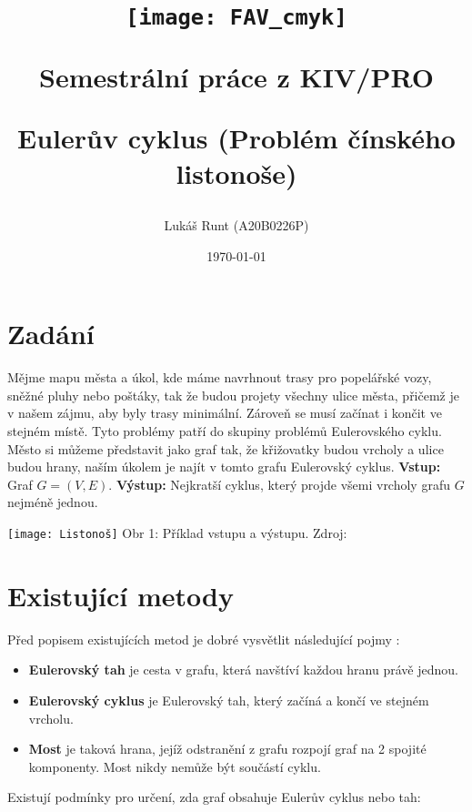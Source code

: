 \documentclass[12pt, a4paper]{article}
\title{\texttt{[image: FAV\_cmyk]}

{\huge Semestrální práce z KIV/PRO}

\vspace{0.5cm}
{\LARGE Eulerův cyklus (Problém čínského listonoše)}
\vspace{1cm}
}
\author{Lukáš Runt (A20B0226P)}
\date{\vspace{7.5cm} \today}
\begin{document}
\begin{titlepage}
\clearpage\maketitle
\thispagestyle{empty}
\end{titlepage}

\tableofcontents
\newpage
\section{Zadání}
Mějme mapu města a úkol, kde máme navrhnout trasy pro popelářské vozy, sněžné pluhy nebo poštáky, tak že budou projety všechny ulice města, přičemž je v našem zájmu, aby byly trasy minimální. Zároveň se musí začínat i končit ve stejném místě. Tyto problémy patří do skupiny problémů Eulerovského cyklu. Město si můžeme představit jako graf tak, že křižovatky budou vrcholy a ulice budou hrany, naším úkolem je najít v tomto grafu Eulerovský cyklus.
\vspace{0.5cm}
\newline\textbf{Vstup:} Graf $G = (V, E)$.
\vspace{0.5cm}
\newline\textbf{Výstup:} Nejkratší cyklus, který projde všemi vrcholy grafu $G$ nejméně jednou.
\begin{center}
	\texttt{[image: Listonoš]}
	\newline Obr 1: Příklad vstupu a výstupu. Zdroj: \cite{skiena1998algorithm}
\end{center}
\section{Existující metody}
Před popisem existujících metod je dobré vysvětlit následující pojmy \cite{Fleury}:
\begin{itemize}
\item \textbf{Eulerovský tah} je cesta v grafu, která navštíví každou hranu právě jednou.
\item \textbf{Eulerovský cyklus} je Eulerovský tah, který začíná a končí ve stejném vrcholu.
\item \textbf{Most} je taková hrana, jejíž odstranění z grafu rozpojí graf na 2 spojité komponenty. Most nikdy nemůže být součástí cyklu.
\end{itemize}
\newpage Existují podmínky pro určení, zda graf obsahuje Eulerův cyklus nebo tah:
\end{document}
